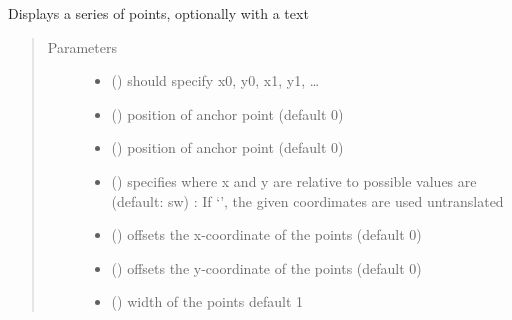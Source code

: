 \documentclass[letterpaper,10pt,english]{sphinxmanual}
\begin{document}

\begin{fulllineitems}
\label{\detokenize{Reference:salabim.AnimatePoints}}
Displays a series of points, optionally with a text
\begin{quote}\begin{description}
\item[{Parameters}] \leavevmode\begin{itemize}
\item {} 
 () \textendash{} should specify x0, y0, x1, y1, …

\item {} 
 () \textendash{} position of anchor point (default 0)

\item {} 
 () \textendash{} position of anchor point (default 0)

\item {} 
 () \textendash{} specifies where x and y are relative to 
possible values are (default: sw) : 
If ‘’, the given coordimates are used untranslated

\item {} 
 () \textendash{} offsets the x-coordinate of the points (default 0)

\item {} 
 () \textendash{} offsets the y-coordinate of the points (default 0)

\item {} 
 () \textendash{} width of the points 
default 1


\end{itemize}
\end{description}
\end{quote}
\end{fulllineitems}
\end{document}
